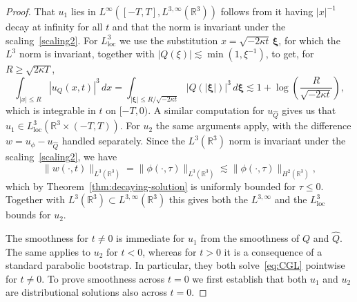 \documentclass[10pt,a4paper]{amsart}
\begin{document}
\begin{proof}
  That \(u_{1}\) lies in
  \(L^{\infty}([-T, T], L^{3,\infty}(\mathbb{R}^{3}))\) follows from
  it having \(|x|^{-1}\) decay at infinity for all \(t\) and that the
  norm is invariant under the scaling~\eqref{scaling2}. For
  \(L_{\text{loc}}^{3}\) we use the substitution
  \(x = \sqrt{-2\kappa t}\,\bm{\xi}\), for which the \(L^{3}\) norm is
  invariant, together with \(|Q(\xi)| \lesssim \min(1, \xi^{-1})\), to
  get, for \(R \geq \sqrt{2\kappa T}\),
  \begin{equation*}
    \int_{|x| \leq R} |u_{Q}(x, t)|^{3}\,dx
    = \int_{|\bm{\xi}| \leq R / \sqrt{-2\kappa t}} |Q(|\bm{\xi}|)|^{3}\,d\bm{\xi}
    \lesssim 1 + \log\left(\frac{R}{\sqrt{-2\kappa t}}\right),
  \end{equation*}
  which is integrable in \(t\) on \([-T, 0)\). A similar computation
  for \(u_{\hat{Q}}\) gives us that
  \(u_{1} \in L_{\text{loc}}^{3}(\mathbb{R}^{3} \times (-T, T))\). For
  \(u_{2}\) the same arguments apply, with the difference
  \(w = u_{\phi} - u_{\hat{Q}}\) handled separately. Since the
  \(L^{3}(\mathbb{R}^{3})\) norm is invariant under the
  scaling~\eqref{scaling2}, we have
  \begin{equation*}
    \|w(\cdot, t)\|_{L^{3}(\mathbb{R}^{3})}
    = \|\phi(\cdot, \tau)\|_{L^{3}(\mathbb{R}^{3})}
    \lesssim \|\phi(\cdot, \tau)\|_{H^{2}(\mathbb{R}^{3})},
  \end{equation*}
  which by Theorem~\ref{thm:decaying-solution} is uniformly bounded
  for \(\tau \leq 0\). Together with
  \(L^{3}(\mathbb{R}^{3}) \subset L^{3,\infty}(\mathbb{R}^{3})\) this
  gives both the \(L^{3,\infty}\) and the \(L_{\text{loc}}^{3}\)
  bounds for \(u_{2}\).

  The smoothness for \(t \neq 0\) is immediate for \(u_{1}\) from the
  smoothness of \(Q\) and \(\hat{Q}\). The same applies to \(u_{2}\)
  for \(t < 0\), whereas for \(t > 0\) it is a consequence of a
  standard parabolic bootstrap. In particular, they both
  solve~\eqref{eq:CGL} pointwise for \(t \neq 0\). To prove smoothness
  across \(t = 0\) we first establish that both \(u_{1}\) and
  \(u_{2}\) are distributional solutions also across \(t = 0\).


\end{proof}
\end{document}
